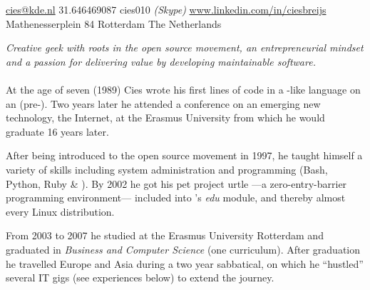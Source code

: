 \documentclass[10pt,a4paper]{article}
\begin{document}
\sloppy  %



\nobreakvspace{0.3em}  %

\noindent\href{mailto:cies.at.kde.dot.nl}{cies\mbox{}@\mbox{}kde.nl}\sbull
\textsmaller{+}31.646469087\sbull
{\newnums cies010} \emph{(Skype)}\sbull
\href{http://www.linkedin.com/in/ciesbreijs}{www.linkedin.com/in/ciesbreijs}
\\
Mathenesserplein 84\sbull
Rotterdam\sbull
The Netherlands

\spacedhrule{0.9em}{-0.4em}  %


\vspace{-1.3em}  %
\begin{multicols}{2}  %
\noindent \emph{Creative geek with roots in the open source movement, an entrepreneurial mindset and a passion for delivering value by developing maintainable software.}
\\
\\
At the age of seven (1989) Cies wrote his first lines of code in a -like language on an  (pre-).  Two years later he attended a conference on an emerging new technology, the Internet, at the Erasmus University from which he would graduate 16 years later.

After being introduced to the open source movement in 1997, he taught himself a variety of skills including system administration and programming (Bash, Python, Ruby \& \CPP).  By 2002 he got his pet project urtle ---a zero-entry-barrier programming environment--- included into 's \emph{edu} module, and thereby almost every Linux distribution.

From 2003 to 2007 he studied at the Erasmus University Rotterdam and graduated in \emph{Business and Computer Science} (one curriculum).  After graduation he travelled Europe and Asia during a two year sabbatical, on which he ``hustled'' several IT gigs (see experiences below) to extend the journey.
\end{multicols}
\end{document}
